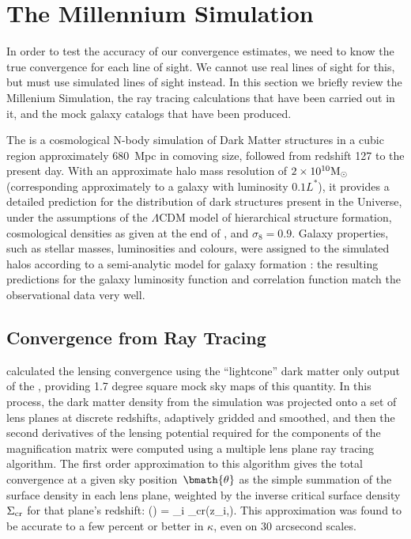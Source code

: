 \documentclass[useAMS,usenatbib]{mn2e}
\begin{document}

\section{The Millennium Simulation}
\label{sec:MS}

In order to test the accuracy of our convergence estimates, we need to
know the true convergence for each line of sight. We cannot use  real
lines of sight for this,  but must use simulated lines of sight instead.
In this section we briefly review the Millenium Simulation, the ray
tracing calculations that have been carried out in it, and the mock
galaxy catalogs that have been produced.

The \MS \citep{SpringelEtal2005} is a cosmological N-body simulation of
Dark Matter structures in a cubic region approximately 680~Mpc in
comoving size, followed from redshift 127 to the present day. With an
approximate halo mass resolution of $2\times10^{10}{\rm M}_{\odot}$
(corresponding approximately to a galaxy with luminosity $0.1L^{*}$), it
provides a detailed prediction for the distribution of dark structures
present in the Universe, under the assumptions of the $\Lambda$CDM model
of hierarchical structure formation, cosmological densities as given at
the end of , and $\sigma_8 = 0.9$. 
Galaxy properties,
such as stellar masses, luminosities and colours, were assigned to the
simulated halos according to a semi-analytic model for galaxy formation
\citep{DeLucia+Blaizot2007}: the resulting predictions for the galaxy
luminosity function and correlation function match the observational
data very well.


\subsection{Convergence from Ray Tracing}
\label{sec:MS:raytracing}

\citet{HilbertEtal2009} calculated the lensing convergence using the
``lightcone'' dark matter only 
output of the \MS, providing 1.7 degree square 
mock sky maps of this
quantity. In this process, the dark matter density from the simulation
was projected onto a set of lens planes at discrete redshifts,
adaptively gridded and smoothed, and then the second derivatives of the 
lensing potential required for the components of the magnification
matrix were computed using a multiple lens plane ray tracing algorithm.
The first order approximation to this algorithm \citep[equation 17
of][]{HilbertEtal2009} gives the total convergence at a given sky
position~$\bmath{\theta}$ as the simple summation of the surface density
in each lens plane, weighted by the inverse critical surface density
$\Sigma_{\rm cr}$ for that plane's redshift:
\be
\kappa(\bmath{\theta}) = \sum_i 
                                     {\Sigma_{\rm cr}(z_i,\zs)}.
\ee
This approximation was found to be accurate to a few percent or better
in $\kappa$, even on 30 arcsecond scales.
\end{document}
